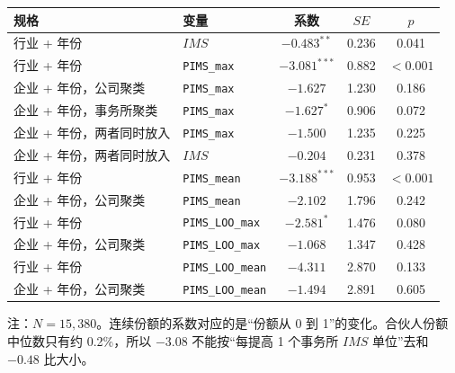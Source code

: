 \documentclass[11pt]{article}
\begin{document}
\begin{center}
\begin{threeparttable}
\caption{事务所份额与连续合伙人份额}
\label{tab:p-cont}
\begin{tabular}{llccc}
\toprule
规格 & 变量 & 系数 & \(SE\) & \(p\) \\
\midrule
行业 + 年份 & \(IMS\) & \(-0.483^{**}\) & 0.236 & 0.041 \\
行业 + 年份 & \texttt{PIMS\_max} & \(-3.081^{***}\) & 0.882 & \(<0.001\) \\
企业 + 年份，公司聚类 & \texttt{PIMS\_max} & \(-1.627\) & 1.230 & 0.186 \\
企业 + 年份，事务所聚类 & \texttt{PIMS\_max} & \(-1.627^{*}\) & 0.906 & 0.072 \\
企业 + 年份，两者同时放入 & \texttt{PIMS\_max} & \(-1.500\) & 1.235 & 0.225 \\
企业 + 年份，两者同时放入 & \(IMS\) & \(-0.204\) & 0.231 & 0.378 \\
\midrule
行业 + 年份 & \texttt{PIMS\_mean} & \(-3.188^{***}\) & 0.953 & \(<0.001\) \\
企业 + 年份，公司聚类 & \texttt{PIMS\_mean} & \(-2.102\) & 1.796 & 0.242 \\
行业 + 年份 & \texttt{PIMS\_LOO\_max} & \(-2.581^{*}\) & 1.476 & 0.080 \\
企业 + 年份，公司聚类 & \texttt{PIMS\_LOO\_max} & \(-1.068\) & 1.347 & 0.428 \\
行业 + 年份 & \texttt{PIMS\_LOO\_mean} & \(-4.311\) & 2.870 & 0.133 \\
企业 + 年份，公司聚类 & \texttt{PIMS\_LOO\_mean} & \(-1.494\) & 2.891 & 0.605 \\
\bottomrule
\end{tabular}
\begin{tablenotes}\footnotesize
\item 注：\(N=15{,}380\)。连续份额的系数对应的是``份额从 0 到 1''的变化。合伙人份额中位数只有约 0.2\%，所以 \(-3.08\) 不能按``每提高 1 个事务所 \(IMS\) 单位''去和 \(-0.48\) 比大小。
\end{tablenotes}
\end{threeparttable}
\end{center}
\end{document}
